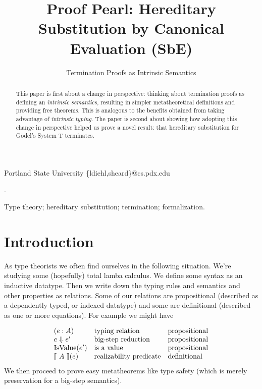 \documentclass[preprint,nonatbib]{sigplanconf}
\numberwithin{mysubdfn}{mydfn}
\def\bigstep{\Downarrow}
\newcommand{\ascribe}[2]{(#1 : #2)}
\newcommand{\el}[1]{\llbracket ~ #1 ~ \rrbracket}
\newcommand{\fun}[1]{\textmd{#1}}
\begin{document}
\setlength{\pdfpageheight}{\paperheight}
\setlength{\pdfpagewidth}{\paperwidth}


\title{Proof Pearl: Hereditary Substitution by Canonical Evaluation (SbE)}
\subtitle{Termination Proofs as Intrinsic Semantics}

           {Portland State University}
           {\{ldiehl,sheard\}@cs.pdx.edu}

\maketitle

\begin{abstract}
This paper is first about a change in perspective: thinking about
termination proofs as defining an {\it intrinsic semantics}, resulting
in simpler metatheoretical definitions and providing free theorems.
This is analogous to the benefits obtained from taking advantage of
{\it intrinsic typing}.
The paper is second about showing how
adopting this change in perspective helped us prove a novel result:
that hereditary substitution for G{\"o}del's System T terminates.
\end{abstract}

.

\keywords
Type theory; hereditary substitution; termination; formalization.

\section{Introduction}
\label{sec:intro}

As type theorists we often find ourselves in the following situation.
We're studying some (hopefully) total lamba calculus. We define some
syntax as an inductive datatype. Then we write down the typing rules and semantics 
and other properties as relations. Some of our relations are propositional (described as a dependently
typed, or indexed datatype) and some are definitional (described as
one or more equations). For example we might have

\[
\begin{array}{lll}

\ascribe{e}{A} & \mbox{typing relation} & \mbox{propositional}\\
e \bigstep e' & \mbox{big-step reduction} & \mbox{propositional} \\ 
\fun{IsValue}(e') & \mbox{is a value} & \mbox{propositional}\\
{\el{A}(e)} & \mbox{realizability predicate} & \mbox{definitional}\\

\end{array}
\]
We then proceed to prove easy metatheorems like type safety (which is merely
preservation for a big-step semantics).
\end{document}
